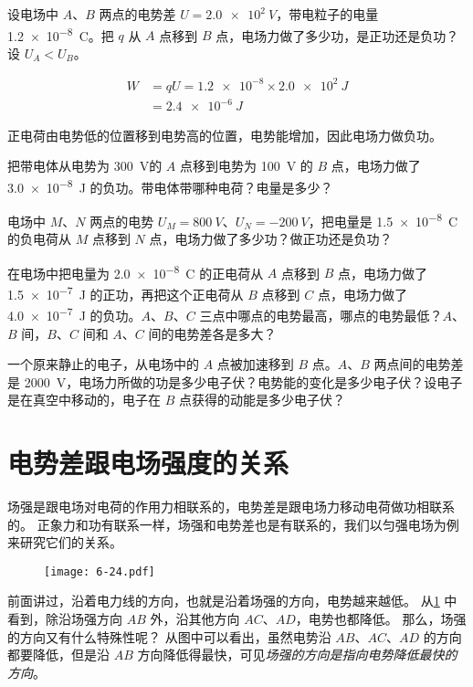 \begin{example}
	设电场中 $A$、$B$ 两点的电势差 $U=\qty{2.0e2}{V}$，带电粒子的电量 \qty{1.2e-8}{C}。把 $q$ 从 $A$ 点移到 $B$ 点，电场力做了多少功，是正功还是负功？设 $U_A<U_B$。
\end{example}

\begin{solution}
\[\begin{split}
	W&=qU=\num{1.2e-8}\times\qty{2.0e2}{J}\\
&=\qty{2.4e-6}{J}
\end{split} \]

正电荷由电势低的位置移到电势高的位置，电势能增加，因此电场力做负功。
\end{solution}

\begin{Practice}
\begin{question}
	\item 把带电体从电势为 \qty{300}{V}的 $A$ 点移到电势为 \qty{100}{V} 的 $B$ 点，电场力做了 \qty{3.0e-8}{J} 的负功。带电体带哪种电荷？电量是多少？
	\item 电场中 $M$、$N$ 两点的电势 $U_M=\qty{800}{V}$、$U_N=-\qty{200}{V}$，把电量是 \qty{1.5e-8}{C} 的负电荷从 $M$ 点移到 $N$ 点，电场力做了多少功？做正功还是负功？
	\item 在电场中把电量为 \qty{2.0e-8}{C} 的正电荷从 $A$ 点移到 $B$ 点，电场力做了 \qty{1.5e-7}{J} 的正功，再把这个正电荷从 $B$ 点移到 $C$ 点，电场力做了 \qty{4.0e-7}{J} 的负功。$A$、$B$、$C$ 三点中哪点的电势最高，哪点的电势最低？$A$、$B$ 间，$B$、$C$ 间和 $A$、$C$ 间的电势差各是多大？
	\item 一个原来静止的电子，从电场中的 $A$ 点被加速移到 $B$ 点。$A$、$B$ 两点间的电势差是 \qty{2000}{V}，电场力所做的功是多少电子伏？电势能的变化是多少电子伏？设电子是在真空中移动的，电子在 $B$ 点获得的动能是多少电子伏？
\end{question}
\end{Practice}


\section{电势差跟电场强度的关系}
场强是跟电场对电荷的作用力相联系的，电势差是跟电场力移动电荷做功相联系的。
正象力和功有联系一样，场强和电势差也是有联系的，我们以匀强电场为例来研究它们的关系。
\begin{figure}
  \texttt{[image: 6-24.pdf]}
	\caption{}\label{fig:6-24}
\end{figure}

前面讲过，沿着电力线的方向，也就是沿着场强的方向，电势越来越低。
从\cref{fig:6-24} 中看到，除沿场强方向 $AB$ 外，沿其他方向 $AC$、$AD$，电势也都降低。
那么，场强的方向又有什么特殊性呢？
从图中可以看出，虽然电势沿 $AB$、$AC$、$AD$ 的方向都要降低，但是沿 $AB$ 方向降低得最快，可见\emph{场强的方向是指向电势降低最快的方向}。

